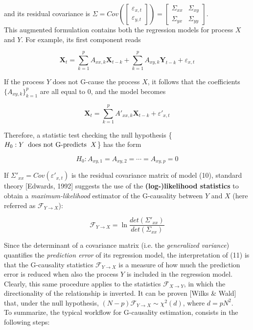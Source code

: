 \documentclass[a4paper]{article}
\begin{document}
and its residual covariance is $ \Sigma = Cov\left(\begin{bmatrix} \varepsilon_{x,t}  \\  \varepsilon_{y,t} \end{bmatrix}\right) = \begin{bmatrix} \Sigma_{xx}  &  \Sigma_{xy} \\  \Sigma_{yx}  & \Sigma_{yy} \end{bmatrix} $.\\
This augmented formulation contains both the regression models for process $X$ and $Y$. For example, its first component reads

\begin{equation}
\textbf{X}_t = \sum_{k=1}^{p} A_{xx,k} \textbf{X}_{t-k} + \sum_{k=1}^{p} A_{xy,k}  \textbf{Y}_{t-k} + \varepsilon_{x,t}
\end{equation}

If the process $Y$ does not G-cause the process $X$, it follows that the coefficients $\{A_{xy,k}\}_{k=1}^p $ are all equal to $0$, and the model becomes

\begin{equation}
\textbf{X}_t = \sum_{k=1}^{p} A'_{xx,k} \textbf{X}_{t-k} + \varepsilon'_{x,t}
\end{equation}

Therefore, a statistic test checking  the null hypothesis \{$ H_0:  Y \hspace{0.2cm} \text{does not G-predicts} \hspace{0.2 cm} X $\} has the form

\begin{equation}
H_0: A_{xy,1} = A_{xy,2} = \cdots = A_{xy,p} = 0
\end{equation}


If  $\Sigma'_{xx} = Cov(\varepsilon'_{x,t}) $ is the residual covariance matrix of model (10), standard theory [Edwards, 1992] suggests the use of the \textbf{(log-)likelihood statistics} to obtain a \textit{maximum-likelihood} estimator of the G-causality between $Y$ and $X$ (here referred as $ \mathcal{F}_{Y \rightarrow X} $):

\begin{equation}
\mathcal{F}_{Y \rightarrow X}  = \ln \frac{det(\Sigma'_{xx})}{det(\Sigma_{xx})}
\end{equation}


Since the determinant of a covariance matrix (i.e. the \textit{generalized variance}) quantifies the \textit{prediction error} of its regression model, the interpretation of (11) is that the G-causality statistics  $ \mathcal{F}_{Y \rightarrow X} $ is a measure of how much the prediction error is reduced when also the process $Y$ is included in the regression model. Clearly, this same procedure applies to the statistics  $ \mathcal{F}_{X \rightarrow Y} $, in which the directionality of the relationship is inverted. It can be proven [Wilks \& Wald] that, under the null hypothesis, $ (N-p)\mathcal{F}_{Y \rightarrow X} \sim \chi^2(d)$, where $ d = pN^2$.
\\
To summarize, the typical workflow for G-causality estimation, consists in the following steps:
\end{document}
